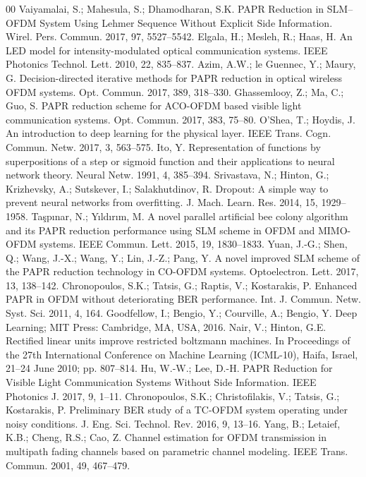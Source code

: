 \documentclass[conference]{IEEEtran}
\begin{document}
\begin{thebibliography}{00}
 Vaiyamalai, S.; Mahesula, S.; Dhamodharan, S.K. PAPR Reduction in SLM--OFDM System Using Lehmer Sequence Without Explicit Side Information. Wirel. Pers. Commun. 2017, 97, 5527--5542.
 Elgala, H.; Mesleh, R.; Haas, H. An LED model for intensity-modulated optical communication systems. IEEE Photonics Technol. Lett. 2010, 22, 835--837.
 Azim, A.W.; le Guennec, Y.; Maury, G. Decision-directed iterative methods for PAPR reduction in optical wireless OFDM systems. Opt. Commun. 2017, 389, 318--330.
 Ghassemlooy, Z.; Ma, C.; Guo, S. PAPR reduction scheme for ACO-OFDM based visible light communication systems. Opt. Commun. 2017, 383, 75--80.
 O'Shea, T.; Hoydis, J. An introduction to deep learning for the physical layer. IEEE Trans. Cogn. Commun. Netw. 2017, 3, 563--575.
 Ito, Y. Representation of functions by superpositions of a step or sigmoid function and their applications to neural network theory. Neural Netw. 1991, 4, 385--394.
 Srivastava, N.; Hinton, G.; Krizhevsky, A.; Sutskever, I.; Salakhutdinov, R. Dropout: A simple way to prevent neural networks from overfitting. J. Mach. Learn. Res. 2014, 15, 1929--1958.
 Ta\c{s}pınar, N.; Yıldırım, M. A novel parallel artificial bee colony algorithm and its PAPR reduction performance using SLM scheme in OFDM and MIMO-OFDM systems. IEEE Commun. Lett. 2015, 19, 1830--1833.
 Yuan, J.-G.; Shen, Q.; Wang, J.-X.; Wang, Y.; Lin, J.-Z.; Pang, Y. A novel improved SLM scheme of the PAPR reduction technology in CO-OFDM systems. Optoelectron. Lett. 2017, 13, 138--142.
 Chronopoulos, S.K.; Tatsis, G.; Raptis, V.; Kostarakis, P. Enhanced PAPR in OFDM without deteriorating BER performance. Int. J. Commun. Netw. Syst. Sci. 2011, 4, 164.
 Goodfellow, I.; Bengio, Y.; Courville, A.; Bengio, Y. Deep Learning; MIT Press: Cambridge, MA, USA, 2016.
 Nair, V.; Hinton, G.E. Rectified linear units improve restricted boltzmann machines. In Proceedings of the 27th International Conference on Machine Learning (ICML-10), Haifa, Israel, 21--24 June 2010; pp. 807--814.
 Hu, W.-W.; Lee, D.-H. PAPR Reduction for Visible Light Communication Systems Without Side Information. IEEE Photonics J. 2017, 9, 1--11.
 Chronopoulos, S.K.; Christofilakis, V.; Tatsis, G.; Kostarakis, P. Preliminary BER study of a TC-OFDM system operating under noisy conditions. J. Eng. Sci. Technol. Rev. 2016, 9, 13--16.
 Yang, B.; Letaief, K.B.; Cheng, R.S.; Cao, Z. Channel estimation for OFDM transmission in multipath fading channels based on parametric channel modeling. IEEE Trans. Commun. 2001, 49, 467--479.

\end{thebibliography}
\end{document}
